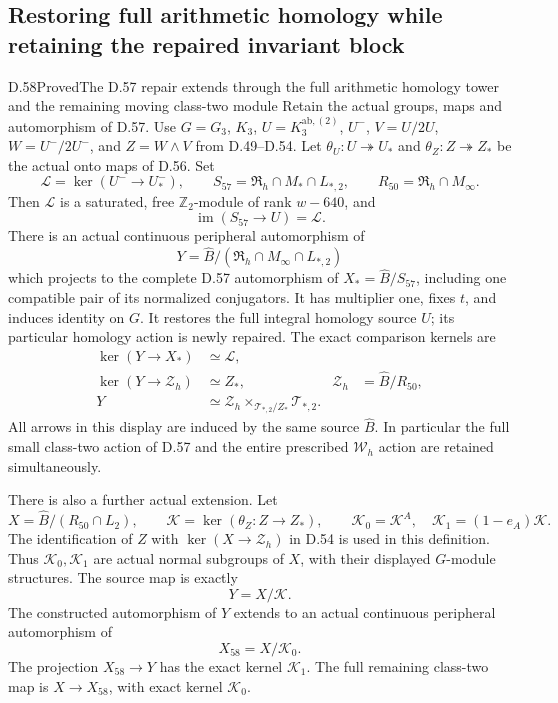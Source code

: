 \subsection*{Restoring full arithmetic homology while retaining the repaired invariant block}

\begin{statement}{D.58}{Proved}{The D.57 repair extends through the full arithmetic homology tower and the remaining moving class-two module}
Retain the actual groups, maps and automorphism of D.57.
Use \(G=G_3\), \(K_3\), \(U=K_3^{\mathrm{ab},(2)}\),
\(U^-\), \(V=U/2U\), \(W=U^-/2U^-\),
and \(Z=W\wedge V\) from D.49--D.54.
Let \(\theta_U:U\twoheadrightarrow U_*\) and
\(\theta_Z:Z\twoheadrightarrow Z_*\) be the actual onto
maps of D.56. Set
\[
 \mathcal L=\ker(U^-\longrightarrow U_*^-),\qquad
 S_{57}=\mathfrak R_h\cap M_*\cap L_{*,2},\qquad
 R_{50}=\mathfrak R_h\cap M_\infty.
 \tag{D.58.1}
\]
Then \(\mathcal L\) is a saturated, free
\(\mathbb Z_2\)-module of rank \(w-640\), and
\[
 \operatorname{im}(S_{57}\longrightarrow U)=\mathcal L.
 \tag{D.58.2}
\]
There is an actual continuous peripheral automorphism of
\[
 Y=\widehat B/(\mathfrak R_h\cap M_\infty\cap L_{*,2})
 \tag{D.58.3}
\]
which projects to the complete D.57 automorphism of
\(X_*=\widehat B/S_{57}\), including one compatible pair
of its normalized conjugators. It has multiplier one,
fixes \(t\), and induces identity on \(G\).
It restores the full integral homology source \(U\);
its particular homology action is newly repaired.
The exact comparison kernels are
\[
 \begin{aligned}
 \ker(Y\longrightarrow X_*)&\simeq\mathcal L,\\
 \ker(Y\longrightarrow\mathcal Z_h)&\simeq Z_*,
       &\mathcal Z_h&=\widehat B/R_{50},\\
 Y&\simeq\mathcal Z_h
            \mathbin{\times}_{\mathcal T_{*,2}/Z_*}
                    \mathcal T_{*,2}.
 \end{aligned}
 \tag{D.58.4}
\]
All arrows in this display are induced by the same source
\(\widehat B\). In particular the full small class-two
action of D.57 and the entire prescribed
\(\mathcal W_h\) action are retained simultaneously.

There is also a further actual extension. Let
\[
 X=\widehat B/(R_{50}\cap L_2),\qquad
 \mathcal K=\ker(\theta_Z:Z\to Z_*),\qquad
 \mathcal K_0=\mathcal K^A,\quad
 \mathcal K_1=(1-e_A)\mathcal K.
 \tag{D.58.5}
\]
The identification of \(Z\) with
\(\ker(X\to\mathcal Z_h)\) in D.54 is used in this
definition. Thus \(\mathcal K_0,\mathcal K_1\) are actual
normal subgroups of \(X\), with their displayed
\(G\)-module structures. The source map is exactly
\[
                  Y=X/\mathcal K.
 \tag{D.58.6}
\]
The constructed automorphism of \(Y\) extends to an
actual continuous peripheral automorphism of
\[
                         X_{58}=X/\mathcal K_0.
 \tag{D.58.7}
\]
The projection \(X_{58}\to Y\) has the exact kernel
\(\mathcal K_1\). The full remaining class-two map is
\(X\to X_{58}\), with exact kernel \(\mathcal K_0\).


\end{statement}
